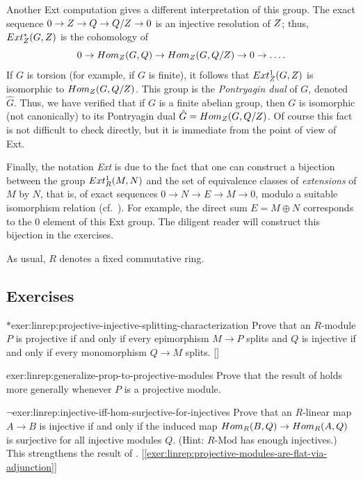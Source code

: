 Another Ext computation gives a different interpretation of this
group. The exact sequence $0 \to Z \to Q \to Q/Z \to 0$ is an
injective resolution of $Z$; thus, $Ext^*_{Z}(G, Z)$ is the
cohomology of
\[
  0 \to Hom_{Z}(G, Q) \to Hom_{Z}(G, Q/Z) \to 0 \to \dots.
\]
If $G$ is torsion (for example, if $G$ is finite), it follows that
$Ext^1_{Z}(G, Z)$ is isomorphic to $Hom_{Z}(G, Q/Z)$. This
group is the \emph{Pontryagin dual} of $G$, denoted $\hat{G}$. Thus,
we have verified that if $G$ is a finite abelian group, then $G$ is
isomorphic (not canonically) to its Pontryagin dual
$\hat{G} = Hom_{Z}(G, Q/Z)$. Of course this fact is not difficult
to check directly, but it is immediate from the point of view of Ext.

Finally, the notation \emph{Ext} is due to the fact that one can
construct a bijection between the group $Ext^1_R(M, N)$ and the set
of equivalence classes of \emph{extensions} of $M$ by $N$, that is, of
exact sequences $0 \to N \to E \to M \to 0$, modulo a suitable
isomorphism relation (cf.\
). For
example, the direct sum $E = M \oplus N$ corresponds to the $0$
element of this Ext group. The diligent reader will construct this
bijection in the exercises.

As usual, $R$ denotes a fixed commutative ring.

\subsection*{Exercises}
\begin{exer}{$*$}{exer:linrep:projective-injective-splitting-characterization}
  Prove that an $R$-module $P$ is projective if and only if every
  epimorphism $M \to P$ splits and $Q$ is injective if and only if
  every monomorphism $Q \to M$
  splits. []
\end{exer}

\begin{exer}{}{exer:linrep:generalize-prop-to-projective-modules}
  Prove that the result of  holds more
  generally whenever $P$ is a projective module.
\end{exer}

\begin{exer}{$\lnot$}{exer:linrep:injective-iff-hom-surjective-for-injectives}
  Prove that an $R$-linear map $A \to B$ is injective if and only if
  the induced map $Hom_R(B, Q) \to Hom_R(A, Q)$ is surjective for
  all injective modules $Q$. (Hint: $R\text{-Mod}$ has enough
  injectives.) This strengthens the result of
  .
  [\ref{exer:linrep:projective-modules-are-flat-via-adjunction}]
\end{exer}

